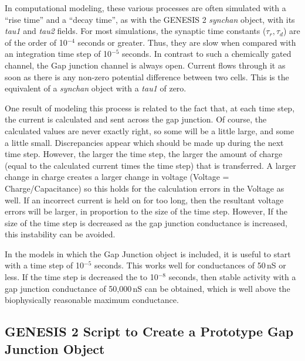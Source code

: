 \documentclass[12pt]{article}
\begin{document}
In computational modeling, these various processes are often simulated with a ``rise time'' and a ``decay time'', as with the GENESIS 2 {\it synchan} object, with its {\it tau1} and {\it tau2} fields. For most simulations, the synaptic time constants ({$\tau_r, \tau_d$}) are of the order of 10$^{-4}$ seconds or greater. Thus, they are slow when compared with an integration time step of 10$^{-5}$ seconds. In contrast to such a chemically gated channel, the Gap junction channel is always open. Current flows through it as soon as there is any non-zero potential difference between two cells. This is the equivalent of a {\it synchan} object with a {\it tau1} of zero.

One result of modeling this process is related to the fact that, at each time step, the current is calculated and sent across the gap junction. Of course, the calculated values are never exactly right, so some will be a little large, and some a little small. Discrepancies appear which should be made up during the next time step. However, the larger the time step, the larger the amount of charge (equal to the calculated current times the time step) that is transferred. A larger change in charge creates a larger change in voltage (Voltage = Charge/Capacitance) so this holds for the calculation errors in the Voltage as well. If an incorrect current is held on for too long, then the resultant voltage errors will be larger, in proportion to the size of the time step. However, If the size of the time step is decreased as the gap junction conductance is increased, this instability can be avoided.

In the models in which the Gap Junction object is included, it is useful to start with a time step of 10$^{-5}$ seconds. This works well for conductances of 50\,nS or less. If the time step is decreased the to 10$^{-8 }$ seconds, then  stable activity with a gap junction conductance of 50,000\,nS can be obtained, which is well above the biophysically reasonable maximum conductance.

\subsection*{GENESIS 2 Script to Create a Prototype Gap Junction Object}
\end{document}
